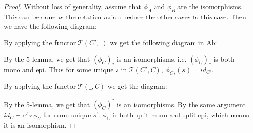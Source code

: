\documentclass[11pt]{article}
\theoremstyle{definition}
\theoremstyle{remark}
\begin{document}
            \begin{proof}
                Without loss of generality, assume that $\phi_A$ and $\phi_B$ are the isomorphisms. This can be done as the rotation axiom reduce the other cases to this case. Then we have the following diagram:
                \begin{center}
                \end{center}
                By applying the functor $\mathcal{T}(C',\_)$ we get the following diagram in Ab:
                \begin{center}
                \end{center}
                By the 5-lemma, we get that $(\phi_C)_*$ is an isomorphisms, i.e. $(\phi_C)_*$ is both mono and epi. Thus for some unique $s$ in $\mathcal{T}(C',C)$, ${\phi_C}_*(s)=id_{C'}$. 

                By applying the functor $\mathcal{T}(\_,C)$ we get the diagram:
                \begin{center}
                \end{center}
                By the 5-lemma, we get that $(\phi_C)^*$ is an isomorphisms. By the same argument $id_{C} = s'\circ\phi_C$ for some unique $s'$. $\phi_C$ is both split mono and split epi, which means it is an isomorphism.
            \end{proof}
\end{document}
